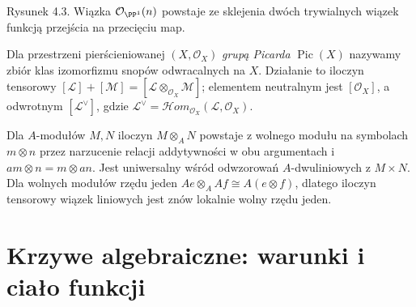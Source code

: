 \begin{center}

{\small Rysunek 4.3. Wiązka $\mathcal O_{\PP^1}(n)$ powstaje ze sklejenia dwóch trywialnych wiązek funkcją przejścia na przecięciu map.}\par
\end{center}

\begin{definicja}
Dla przestrzeni pierścieniowanej $(X,\mathcal O_X)$
\emph{grupą Picarda} $\operatorname{Pic}(X)$
nazywamy zbiór klas izomorfizmu snopów odwracalnych
na $X$. Działanie to iloczyn tensorowy
$[\mathcal L]+[\mathcal M]=[\mathcal L\otimes_{\mathcal O_X}\mathcal M]$;
elementem neutralnym jest $[\mathcal O_X]$, a odwrotnym
$[\mathcal L^\vee]$, gdzie
$\mathcal L^\vee=\mathcal{H}om_{\mathcal O_X}
(\mathcal L,\mathcal O_X)$.
\end{definicja}

\begin{uwaga}
Dla $A$-modułów $M,N$ iloczyn $M\otimes_A N$ powstaje
z wolnego modułu na symbolach $m\otimes n$ przez
narzucenie relacji addytywności w obu argumentach
i $am\otimes n=m\otimes an$. Jest uniwersalny
wśród odwzorowań $A$-dwuliniowych z $M\times N$.
Dla wolnych modułów rzędu jeden
$Ae\otimes_A Af\cong A(e\otimes f)$, dlatego
iloczyn tensorowy wiązek liniowych jest znów
lokalnie wolny rzędu jeden.
\end{uwaga}

\section{Krzywe algebraiczne: warunki i ciało funkcji}
\label{sec:curves-intro}

